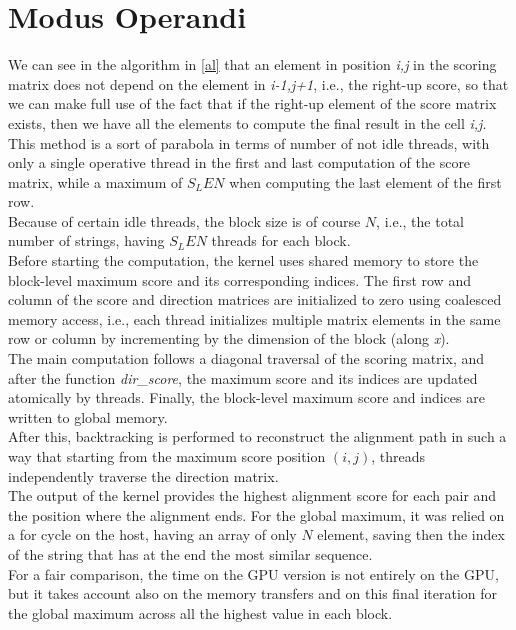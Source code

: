 \documentclass[conference]{IEEEtran}
\begin{document}
    \section{Modus Operandi}
    We can see in the algorithm in \ref{al} that an element in position \textit{i,j} in the scoring matrix does not depend on the element in \textit{i-1,j+1}, i.e., the right-up score, so that we can make full use of the fact that if the right-up element of the score matrix exists, then we have all the elements to compute the final result in the cell \textit{i,j}. This method is a sort of parabola in terms of number of not idle threads, with only a single operative thread in the first and last computation of the score matrix, while a maximum of $S_LEN$ when computing the last element of the first row.\\
    Because of certain idle threads, the block size is of course $N$, i.e., the total number of strings, having $S_LEN$ threads for each block.\\
    Before starting the computation, the kernel uses shared memory to store the block-level maximum score and its corresponding indices. The first row and column of the score and direction matrices are initialized to zero using coalesced memory access, i.e., each thread initializes multiple matrix elements in the same row or column by incrementing by the dimension of the block (along \textit{x}).\\
    The main computation follows a diagonal traversal of the scoring matrix, and after the function \textit{dir\_score}, the maximum score and its indices are updated atomically by threads. Finally, the block-level maximum score and indices are written to global memory.\\
    After this, backtracking is performed to reconstruct the alignment path in such a way that starting from the maximum score position \((i, j)\), threads independently traverse the direction matrix.\\
    The output of the kernel provides the highest alignment score for each pair and the position where the alignment ends. For the global maximum, it was relied on a for cycle on the host, having an array of only $N$ element, saving then the index of the string that has at the end the most similar sequence.\\
    For a fair comparison, the time on the GPU version is not entirely on the GPU, but it takes account also on the memory transfers and on this final iteration for the global maximum across all the highest value in each block.
    
\end{document}
